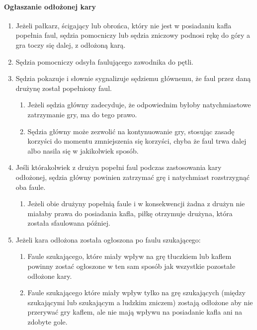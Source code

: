 \documentclass[12pt]{article}
\begin{document}
\paragraph{Ogłaszanie odłożonej kary}

\begin{enumerate}
	\item
	      Jeżeli pałkarz, ścigający lub obrońca, który nie jest w posiadaniu
	      kafla popełnia faul, sędzia pomocniczy lub sędzia zniczowy podnosi
	      rękę do góry a gra toczy się dalej, z odłożoną karą.
	\item
	      Sędzia pomocniczy odsyła faulującego zawodnika do pętli.
	\item
	      Sędzia pokazuje i słownie sygnalizuje sędziemu głównemu, że faul przez
	      daną drużynę został popełniony faul.

	      \begin{enumerate}
		      \item
		            Jeżeli sędzia główny zadecyduje, że odpowiednim byłoby
		            natychmiastowe zatrzymanie gry, ma do tego prawo.
		      \item
		            Sędzia główny może zezwolić na kontynuowanie gry, stosując zasadę
		            korzyści do momentu zmniejszenia się korzyści, chyba że faul trwa
		            dalej albo nasila się w jakikolwiek sposób.
	      \end{enumerate}
	\item
	      Jeśli którakolwiek z drużyn popełni faul podczas zastosowania kary
	      odłożonej, sędzia główny powinien zatrzymać grę i natychmiast
	      rozstrzygnąć oba faule.

	      \begin{enumerate}
		      \item
		            Jeżeli obie drużyny popełnią faule i w konsekwencji żadna z drużyn
		            nie miałaby prawa do posiadania kafla, piłkę otrzymuje drużyna,
		            która została sfaulowana później.
	      \end{enumerate}
	\item
	      Jeżeli kara odłożona została ogłoszona po faulu szukającego:

	      \begin{enumerate}
		      \item
		            Faule szukającego, które miały wpływ na grę tłuczkiem lub kaflem
		            powinny zostać ogłoszone w ten sam sposób jak wszystkie pozostałe
		            odłożone kary.
		      \item
		            Faule szukającego które miały wpływ tylko na grę szukających (między
		            szukającymi lub szukającym a ludzkim zniczem) zostają odłożone aby
		            nie przerywać gry kaflem, ale nie mają wpływu na posiadanie kafla
		            ani na zdobyte gole.
	      \end{enumerate}
\end{enumerate}
\end{document}
